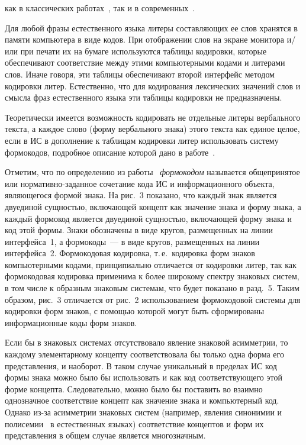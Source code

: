\begin{multicols}{2}

\noindent
как в 
классических работах~\cite{36zat}, так и в современных~\cite{37zat}.
   
   Для любой фразы естественного языка литеры составляющих ее слов хранятся в памяти 
компьютера в виде кодов. При отображении слов на экране монитора и/или при печати их на 
бумаге используются таблицы кодировки, которые обеспечивают соответствие между этими 
компьютерными кодами и литерами слов. Иначе говоря, эти таблицы обеспечивают второй 
интерфейс методом кодировки литер. Естественно, что для кодирования лексических 
значений слов и смысла фраз естественного языка эти таблицы кодировки не предназначены.
   
   Теоретически имеется возможность кодировать не отдельные литеры вербального текста, 
а каждое слово (форму вербального знака) этого текста как единое целое, если в ИС в 
дополнение к таблицам кодировки литер использовать систему формокодов, подробное 
описание которой дано в работе~\cite{38zat}.
   
   Отметим, что по определению из работы~\cite{38zat} \textit{формокодом} называется 
общепринятое или нор\-ма\-тив\-но-за\-дан\-ное сочетание кода ИС и информационного объекта, 
являющегося формой знака. На рис.~3 показано, что каждый знак является 
дву\-еди\-ной сущностью, включающей концепт как значение знака и форму знака, а каждый 
формокод является дву\-еди\-ной сущностью, включающей форму знака и код этой формы. 
Знаки обозначены в виде кругов, размещенных на линии интерфейса~1, а формокоды~--- в 
виде кругов, размещенных на линии интерфейса~2. Формокодовая 
кодировка, т.\,е.\ кодировка форм знаков компьютерными кодами, принципиально 
отличается от кодировки литер, так как формокодовая кодировка применима к более 
широкому спектру знаковых систем, в том числе к образным знаковым системам, что будет 
показано в разд.~5. Таким образом, рис.~3 отличается от рис.~2 
использованием формокодовой системы для кодировки форм знаков, с помощью которой 
могут быть сформированы информационные коды форм знаков.
   
   Если бы в знаковых системах отсутствовало явление знаковой асимметрии, то каждому 
элементарному концепту соответствовала бы только одна форма его представления, и 
наоборот. В таком случае уникальный в пределах ИС код формы знака можно было бы 
использовать и как код соответствующего этой форме концепта. Следовательно, можно было 
бы поставить во взаимно однозначное соответствие концепт как значение знака и 
компьютерный код. Однако из-за асимметрии знаковых систем (например, явления 
синонимии и полисемии~\cite{39zat} в естественных языках) соответствие концептов и 
форм их представления в общем случае является многозначным.
  

\end{multicols}
